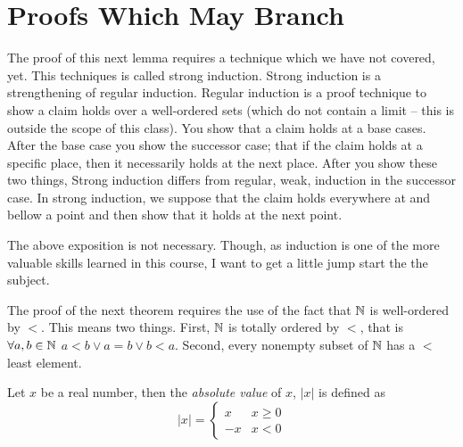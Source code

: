 \section{Proofs Which May Branch}




The proof of this next lemma requires a technique which we have not covered, yet.
This techniques is called strong induction.
Strong induction is a strengthening of regular induction.
Regular induction is a proof technique to show a claim holds over a well-ordered sets (which do not contain a limit -- this is outside the scope of this class).
You show that a claim holds at a base cases.
After the base case you show the successor case; that if the claim holds at a specific place, then it necessarily holds at the next place.
After you show these two things,
Strong induction differs from regular, weak, induction in the successor case.
In strong induction, we suppose that the claim holds everywhere at and bellow a point and then show that it holds at the next point.

The above exposition is not necessary.
Though, as induction is one of the more valuable skills learned in this course, I want to get a little jump start the the subject.


The proof of the next theorem requires the use of the fact that $\mathbb{N}$ is well-ordered by $<$.
This means two things.
First, $\mathbb{N}$ is totally ordered by $<$, that is $\forall a,b\in\mathbb{N}$ $a<b\vee a=b\vee b<a$.
Second, every nonempty subset of $\mathbb{N}$ has a $<$ least element.










\begin{defn}
\label{defn:absoluteValue}
  Let $x$ be a real number, then the \emph{absolute value} of $x$, $\vert x\vert$ is defined as
  \[ \vert x\vert = \begin{cases}
      x & x\geq 0 \\
      -x& x < 0
   \end{cases} \]
\end{defn}


